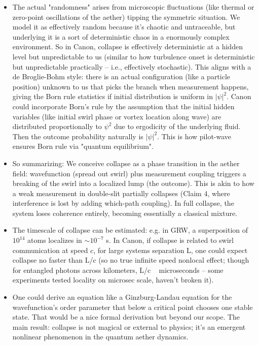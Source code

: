 \documentclass[11pt]{article}
\begin{document}
\begin{itemize}
\item 
The actual "randomness" arises from microscopic fluctuations (like thermal or zero-point oscillations of the aether) tipping the symmetric situation. We model it as effectively random because it’s chaotic and untraceable, but underlying it is a sort of deterministic chaos in a enormously complex environment. So in Canon, collapse is effectively deterministic at a hidden level but unpredictable to us (similar to how turbulence onset is deterministic but unpredictable practically – i.e., effectively stochastic). This aligns with a de Broglie-Bohm style: there is an actual configuration (like a particle position) unknown to us that picks the branch when measurement happens, giving the Born rule statistics if initial distribution is uniform in $|\psi|^2$. Canon could incorporate Born’s rule by the assumption that the initial hidden variables (like initial swirl phase or vortex location along wave) are distributed proportionally to $\psi^2$ due to ergodicity of the underlying fluid. Then the outcome probability naturally is $|\psi|^2$. This is how pilot-wave ensures Born rule via "quantum equilibrium".




\item 
So summarizing: We conceive collapse as a phase transition in the aether field: wavefunction (spread out swirl) plus measurement coupling triggers a breaking of the swirl into a localized lump (the outcome). This is akin to how a weak measurement in double-slit partially collapses (Claim 4, where interference is lost by adding which-path coupling). In full collapse, the system loses coherence entirely, becoming essentially a classical mixture.




\item 
The timescale of collapse can be estimated: e.g. in GRW, a superposition of $10^{14}$ atoms localizes in $\sim 10^{-7}$ s. In Canon, if collapse is related to swirl communication at speed $c$, for large systems separation L, one could expect collapse no faster than L/c (so no true infinite speed nonlocal effect; though for entangled photons across kilometers, L/c ~ microseconds – some experiments tested locality on microsec scale, haven't broken it).




\item 
One could derive an equation like a Ginzburg-Landau equation for the wavefunction’s order parameter that below a critical point chooses one stable state. That would be a nice formal derivation but beyond our scope. The main result: collapse is not magical or external to physics; it's an emergent nonlinear phenomenon in the quantum aether dynamics.




\end{itemize}
\end{document}
